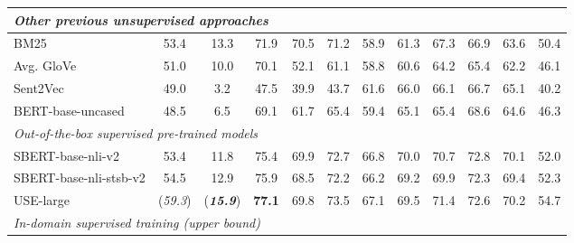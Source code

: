 \documentclass[11pt]{article}
\begin{document}
\begin{table*}[t]
{\begin{tabular}{|l|c|c|ccc|ccccc|c|}
\hline
\multicolumn{12}{|l|}{ \textit{Other previous unsupervised approaches} }                                                                                                                                                                                                                               \\ 
\hline
BM25              & {53.4}                       & 13.3                    & 71.9                   & 70.5                   & 71.2                      & 58.9           & 61.3           & 67.3                           & 66.9           & 63.6                      & 50.4                   \\Avg. GloVe        & 51.0                               & {10.0}           & {70.1}           & {52.1}           & {61.1}              & 58.8           & 60.6           & 64.2                           & 65.4           & 62.2                      & {46.1}           \\
Sent2Vec          & 49.0                               & 3.2                    & 47.5                   & 39.9                   & 43.7                      & {61.6}   & {66.0}   & {66.1}                   & {66.7}   & {65.1}              & 40.2                   \\ 
BERT-base-uncased & 48.5 & 6.5 & 69.1 & 61.7 & 65.4 & 59.4 & 65.1 & 65.4 & 68.6 & 64.6 & 46.3 \\
\hline
\multicolumn{12}{|l|}{ \textit{Out-of-the-box supervised pre-trained models} }                                                                                                                                                                                                                         \\ 
\hline
SBERT-base-nli-v2 & 53.4 & 11.8 & 75.4 & 69.9 & 72.7 & 66.8 & 70.0 & 70.7 & 72.8 & 70.1 & 52.0 \\
SBERT-base-nli-stsb-v2 & 54.5 & 12.9 & 75.9 & 68.5 & 72.2 & 66.2 & 69.2 & 69.9 & 72.3 & 69.4 & 52.3\\
USE-large         & (\textit{59.3})                       & (\textit{\textbf{15.9}})  & \textbf{77.1}  & 69.8           & 73.5     & 67.1   & 69.5   & 71.4                   & 72.6   & {70.2}              & {54.7}           \\ 
\hline
\multicolumn{12}{|l|}{ \textit{In-domain supervised training (upper bound)} }                                                                                                                                                                                                                          \\ 

\end{tabular}}
\end{table*}
\end{document}
